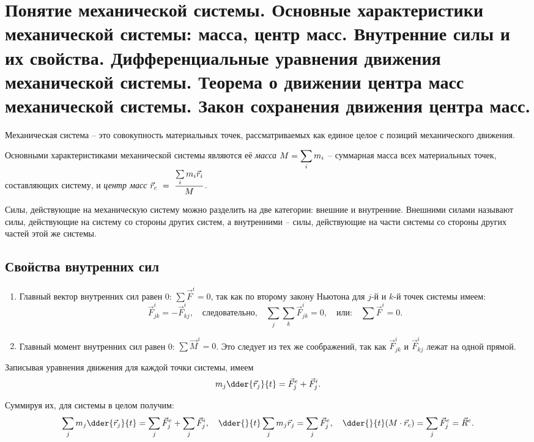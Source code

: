 \chapter{Понятие механической системы. Основные характеристики механической
системы: масса, центр масс. Внутренние силы и их свойства. Дифференциальные
уравнения движения механической системы. Теорема о движении центра масс
механической системы. Закон сохранения движения центра масс.}

Механическая система -- это совокупность материальных точек, рассматриваемых как
единое целое с позиций механического движения.

Основными характеристиками механической системы являются её \emph{масса}
\( \displaystyle M = \sum_i m_i \) -- суммарная масса всех материальных точек,
составляющих систему, и \emph{центр масс} \( \displaystyle \vec{r}_c~=~\frac{\sum\limits_i
m_i\vec{r}_i}{M} \).

Силы, действующие на механическую систему можно разделить на две категории:
внешние и внутренние. Внешними силами называют силы, действующие на систему со
стороны других систем, а внутренними -- силы, действующие на части системы со
стороны других частей этой же системы.

\section{Свойства внутренних сил}
\begin{enumerate}
    \item Главный вектор внутренних сил равен 0: \( \sum\vec{F}^i = 0 \), так
    как по второму закону Ньютона для \( j \)-й и \( k \)-й точек системы имеем:
    \[
        \vec{F}^i_{jk} = -\vec{F}^i_{kj}, \quad \text{следовательно,}\quad
        \sum_j\sum_k \vec{F}^i_{jk} = 0, \quad \text{или:} \quad
        \sum \vec{F}^i = 0.
    \]
    
    \item Главный момент внутренних сил равен 0: \( \sum \vec{M}^i = 0 \). Это
    следует из тех же соображений, так как \( \vec{F}^i_{jk} \) и
    \( \vec{F}^i_{kj} \) лежат на одной прямой.
\end{enumerate}


Записывая уравнения движения для каждой точки системы, имеем
\[
    m_j \dder{\vec{r}_j}{t} = \vec{F}^e_j + \vec{F}^i_j.
\]

Суммируя их, для системы в целом получим:
\[
    \sum_j m_j \dder{\vec{r}_j}{t} = \sum_j\vec{F}^e_j + \sum_j\vec{F}^i_j,\quad
    \dder{}{t}\sum_j m_j \vec{r}_j = \sum_j \vec{F}^e_j, \quad
    \dder{}{t}(M\cdot\vec{r}_c) = \sum_j \vec{F}^e_j = \vec{R}^e.
\]

